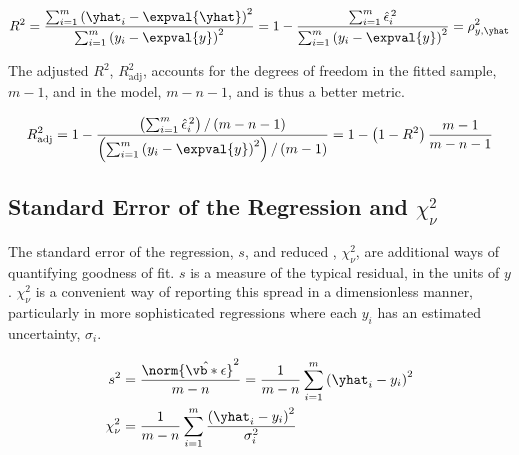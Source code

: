 \begin{equation}\label{eq:regression:goodness_of_fit:R2}
R^{2} = \frac{
\sum_{i=1}^{m} \left(\yhat_{i} - \expval{\yhat}\right)^{2}
}{
\sum_{i=1}^{m} \left(y_{i} - \expval{y}\right)^{2}
} = 1 - \frac{
\sum_{i=1}^{m} \hat{\epsilon}_{i}^{\,2}
}{
\sum_{i=1}^{m} \left(y_{i} - \expval{y}\right)^{2}
} = \rho_{y,\yhat}^{2}
\end{equation}

The adjusted $R^{2}$, $R^{2}_{\text{adj}}$, accounts for the degrees of freedom in the
fitted sample, $m-1$, and in the model, $m-n-1$, and is thus a better metric.

\begin{equation}\label{eq:regression:goodness_of_fit:R2_adj}
R^{2}_{\text{adj}} = 1 - \frac{
\left(\sum_{i=1}^{m} \hat{\epsilon}_{i}^{\,2}\right)/\left(m-n-1\right)
}{
\left(\sum_{i=1}^{m} \left(y_{i} - \expval{y}\right)^{2}\right)/\left(m-1\right)
}
= 1 - \left(1-R^{2}\right)\frac{m-1}{m-n-1}
\end{equation}

\subsection{Standard Error of the Regression and \texorpdfstring{$\chi_{\nu}^{2}$}{Chi-Nu}}
\label{regression:goodness_of_fit:reduced_chi2}

The standard error of the regression, $s$,
and reduced \chiSqstat, $\chi_{\nu}^{2}$,
are additional ways of quantifying goodness of fit.
$s$ is a measure of the typical residual, in the units of $y$.
$\chi_{\nu}^{2}$ is a convenient way of reporting this spread in a dimensionless manner,
particularly in more sophisticated regressions where each $y_{i}$ has an \apriori estimated uncertainty, $\sigma_{i}$.

\begin{subequations}\label{eq:regression:goodness_of_fit:s_red_chi2}
\begin{align}
s^{2} &= \frac{\norm{\hat{\vb*{\epsilon}}}^{2}}{m-n} = \frac{1}{m-n} \sum_{i=1}^{m} \left(\yhat_{i} - y_{i}\right)^{2} \label{eq:regression:goodness_of_fit:s} \\
\chi_{\nu}^{2} &= \frac{1}{m-n} \sum_{i=1}^{m} \frac{\left(\yhat_{i} - y_{i}\right)^{2}}{\sigma_{i}^{2}} \label{eq:regression:goodness_of_fit:red_chi2}
\end{align}
\end{subequations}

